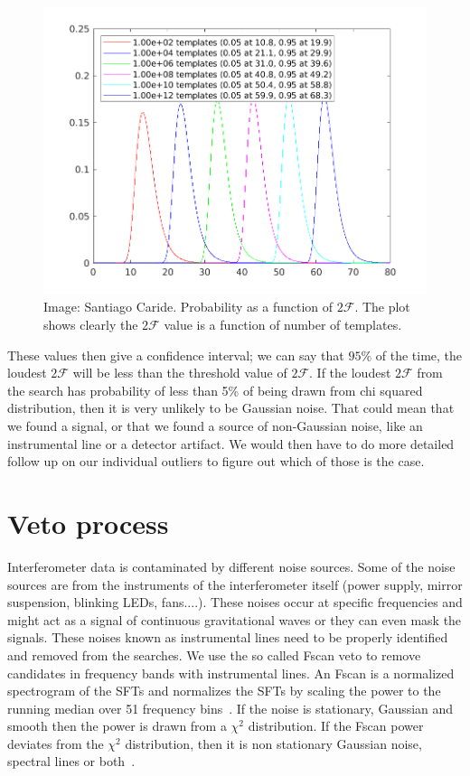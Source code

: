 \documentclass{ttuthes2007}
\begin{document}
\begin{figure}[bht!]                                                            
        \includegraphics[width=\textwidth]{figure/2F_max.png}                  
        \caption{Image: Santiago Caride. Probability as a function of
                 $2\mathcal{F}$. The
                 plot shows clearly the $2\mathcal{F}$ value is a function of number of  templates.}                             
        \label{fig:2F_max}                                                  
\end{figure} 
These values then give a confidence interval; we can say that $95\%$ of the
time, the loudest  $2\mathcal{F}$ will be less than the threshold value of
$2\mathcal{F}$. If the loudest  $2\mathcal{F}$ from the search has probability
of less than 5\% of being drawn from chi squared distribution, then it is very
unlikely to be Gaussian noise. That could mean that we found a signal, or that
we found a source of non-Gaussian noise, like an instrumental line or a detector
artifact. We would then have to do more detailed follow up on our individual
outliers to figure out which of those is the case.

\section{Veto process}
Interferometer data is contaminated by different noise sources. Some of the
noise sources are from the instruments of the interferometer itself (power supply, mirror
suspension, blinking LEDs, fans....). These noises occur at specific
frequencies and might act as a signal of continuous gravitational waves or they
can even mask the signals. These noises known as instrumental lines need to be
properly identified and removed from the searches. We use the so called Fscan
veto to remove candidates in frequency bands with instrumental lines. An Fscan
is a normalized spectrogram of the SFTs and normalizes the SFTs by scaling the
power to the running median over 51 frequency bins~\cite{Aasi_2015}. If the
noise is stationary, Gaussian and smooth then the power is drawn from a $\chi^2$
distribution. If the Fscan power deviates from the $\chi^2$ distribution, then
it is non stationary Gaussian noise, spectral lines or both~\cite{Aasi_2015}.
\end{document}
